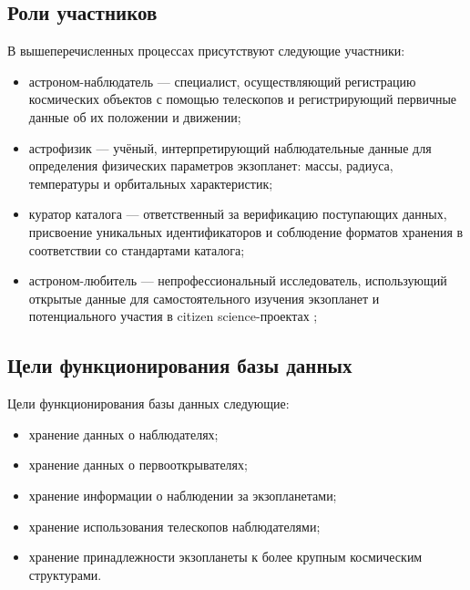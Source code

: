 \documentclass[14pt,a4paper]{extarticle}
\begin{document}
	\subsection{Роли участников}
	В вышеперечисленных процессах присутствуют следующие участники:
	\begin{itemize}
		\item астроном-наблюдатель --- специалист, осуществляющий регистрацию космических объектов с помощью телескопов и регистрирующий первичные данные об их положении и движении;
		\item астрофизик --- учёный, интерпретирующий наблюдательные данные для определения физических параметров экзопланет: массы, радиуса, температуры и орбитальных характеристик;
		\item куратор каталога --- ответственный за верификацию поступающих данных, присвоение уникальных идентификаторов и соблюдение форматов хранения в соответствии со стандартами каталога;
		\item астроном-любитель --- непрофессиональный исследователь, использующий открытые данные для самостоятельного изучения экзопланет и потенциального участия в citizen science-проектах \cite{citizen-science-ru};
	\end{itemize}
	
	\subsection{Цели функционирования базы данных}
	Цели функционирования базы данных следующие:
	\begin{itemize}
		\item хранение данных о наблюдателях;
		\item хранение данных о первооткрывателях;
		\item хранение информации о наблюдении за экзопланетами;
		\item хранение использования телескопов наблюдателями;
		\item хранение принадлежности экзопланеты к более крупным космическим структурами.
	\end{itemize}
	
\end{document}
